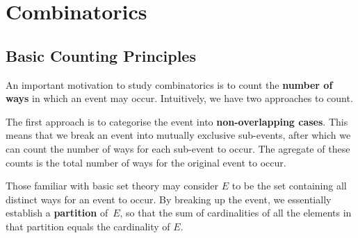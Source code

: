 \documentclass[math]{amznotes}
\theoremstyle{remark}
\begin{document}
\tableofcontents

\chapter{Combinatorics}
\section{Basic Counting Principles}
An important motivation to study combinatorics is to count the \textbf{number of ways} in which an event may occur. Intuitively, we have two approaches to count.

The first approach is to categorise the event into \textbf{non-overlapping cases}. This means that we break an event into mutually exclusive sub-events, after which we can count the number of ways for each sub-event to occur. The agregate of these counts is the total number of ways for the original event to occur.

Those familiar with basic set theory may consider $E$ to be the set containing all distinct ways for an event to occur. By breaking up the event, we essentially establish a \textbf{partition} of~$E$, so that the sum of cardinalities of all the elements in that partition equals the cardinality of $E$.
\end{document}
